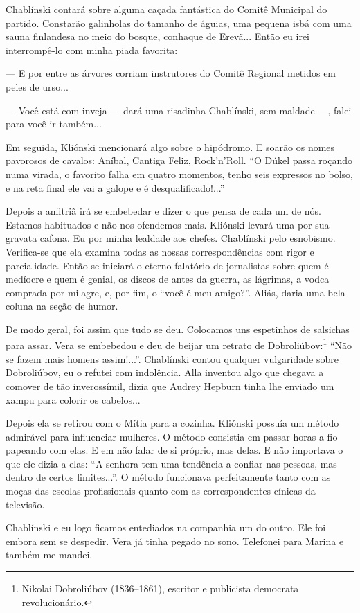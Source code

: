 Chablínski contará sobre alguma caçada fantástica do Comitê Municipal do
partido. Constarão galinholas do tamanho de águias, uma pequena isbá com
uma sauna finlandesa no meio do bosque, conhaque de Erevã... Então eu
irei interrompê-lo com minha piada favorita:

--- E por entre as árvores corriam instrutores do Comitê Regional
metidos em peles de urso...

--- Você está com inveja --- dará uma risadinha Chablínski, sem maldade
---, falei para você ir também...

Em seguida, Kliónski mencionará algo sobre o hipódromo. E soarão os
nomes pavorosos de cavalos: Aníbal, Cantiga Feliz, Rock'n'Roll. ``O
Dúkel passa roçando numa virada, o favorito falha em quatro momentos,
tenho seis expressos no bolso, e na reta final ele vai a galope e é
desqualificado!...''

Depois a anfitriã irá se embebedar e dizer o que pensa de cada um de
nós. Estamos habituados e não nos ofendemos mais. Kliónski levará uma
por sua gravata cafona. Eu por minha lealdade aos chefes. Chablínski
pelo esnobismo. Verifica-se que ela examina todas as nossas
correspondências com rigor e parcialidade. Então se iniciará o eterno
falatório de jornalistas sobre quem é medíocre e quem é genial, os
discos de antes da guerra, as lágrimas, a vodca comprada por milagre, e,
por fim, o ``você é meu amigo?''. Aliás, daria uma bela coluna na seção
de humor.

De modo geral, foi assim que tudo se deu. Colocamos uns espetinhos de
salsichas para assar. Vera se embebedou e deu de beijar um retrato de
Dobroliúbov:\footnote{Nikolai Dobroliúbov (1836--1861), escritor e
  publicista democrata revolucionário.} ``Não se fazem mais homens
assim!...''. Chablínski contou qualquer vulgaridade sobre Dobroliúbov,
eu o refutei com indolência. Alla inventou algo que chegava a comover de
tão inverossímil, dizia que Audrey Hepburn tinha lhe enviado um xampu
para colorir os cabelos...

Depois ela se retirou com o Mítia para a cozinha. Kliónski possuía um
método admirável para influenciar mulheres. O método consistia em passar
horas a fio papeando com elas. E em não falar de si próprio, mas delas.
E não importava o que ele dizia a elas: ``A senhora tem uma tendência a
confiar nas pessoas, mas dentro de certos limites...''. O método
funcionava perfeitamente tanto com as moças das escolas profissionais
quanto com as correspondentes cínicas da televisão.

Chablínski e eu logo ficamos entediados na companhia um do outro. Ele
foi embora sem se despedir. Vera já tinha pegado no sono. Telefonei para
Marina e também me mandei.

